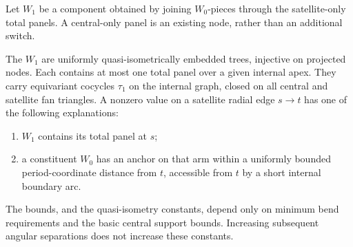 Let $W_1$ be a component obtained by joining $W_0$-pieces through the
satellite-only total panels. A central-only panel is an existing node,
rather than an additional switch.

\begin{lemma}\label{boundary:internal-trees}
The $W_1$ are uniformly quasi-isometrically embedded trees, injective on
projected nodes. Each contains at most one total panel over a given internal
apex. They carry equivariant cocycles $\tau_1$ on the internal graph, closed
on all central and satellite fan triangles. A nonzero value on a satellite
radial edge $s\to t$ has one of the following explanations:
\begin{enumerate}[label=\textup{(\roman*)}]
\item $W_1$ contains its total panel at $s$;
\item a constituent $W_0$ has an anchor on that arm within a uniformly
bounded period-coordinate distance from $t$, accessible from $t$ by a short
internal boundary arc.
\end{enumerate}
The bounds, and the quasi-isometry constants, depend only on minimum bend
requirements and the basic central support bounds. Increasing subsequent
angular separations does not increase these constants.
\end{lemma}

